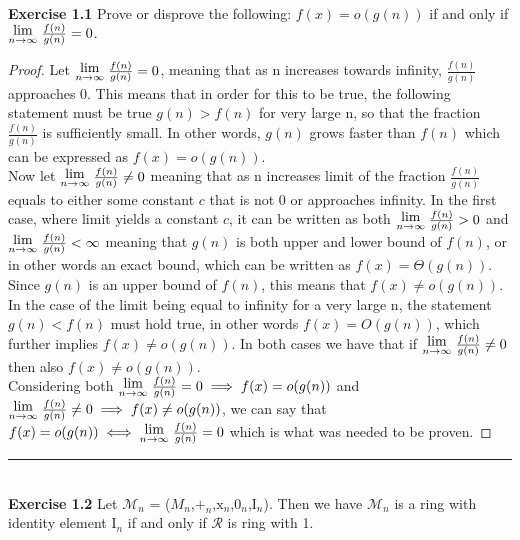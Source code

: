 \documentclass{article}
\newcommand{\Lim}[1]{\raisebox{0.5ex}{{$\displaystyle \lim_{#1}\;$}}}
\newcommand{\subtitle}[1]{%
  \posttitle{%
    \par\end{center}
    \begin{center}\LARGE#1\end{center}
    \vskip0.5em}%
}
\begin{document}
\subtitle{Lecture I}\\
\noindent \textbf{Exercise 1.1} Prove or disprove the following: $f(x) = o(g(n))$ if and only if $\Lim{n \to \infty} \frac{f(n)}{g(n)}=0$.
\begin{proof}
  Let $\Lim{n \to \infty} \frac{f(n)}{g(n)}=0$, meaning that as n increases towards infinity, $\frac{f(n)}{g(n)}$ approaches 0. This means that in order for this to be true, the following statement must be true $g(n) > f(n)$ for very large n, so that the fraction $\frac{f(n)}{g(n)}$ is sufficiently small. In other words, $g(n)$ grows faster than $f(n)$ which can be expressed as $f(x) = o(g(n))$. \\
  
  Now let $\Lim{n \to \infty} \frac{f(n)}{g(n)}\neq0$ meaning that as n increases limit of the fraction $\frac{f(n)}{g(n)}$ equals to either some constant $c$ that is not 0 or approaches infinity. In the first case, where limit yields a constant $c$, it can be written as both $\Lim{n \to \infty} \frac{f(n)}{g(n)}>0$ and $\Lim{n \to \infty} \frac{f(n)}{g(n)}<\infty$ meaning that $g(n)$ is both upper and lower bound of $f(n)$, or in other words an exact bound, which can be written as $f(x) = \Theta(g(n))$. Since $g(n)$ is an upper bound of $f(n)$, this means that $f(x) \neq o(g(n))$. In the case of the limit being equal to infinity for a very large n, the statement $g(n) < f(n)$ must hold true, in other words $f(x) = O(g(n))$, which further implies $f(x) \neq o(g(n))$. In both cases we have that if $\Lim{n \to \infty} \frac{f(n)}{g(n)}\neq0$ then also $f(x) \neq o(g(n))$. \\
  
  Considering both $\Lim{n \to \infty} \frac{f(n)}{g(n)}=0 \implies f(x) = o(g(n))$ and $\Lim{n \to \infty} \frac{f(n)}{g(n)}\neq0 \implies f(x) \neq o(g(n))$, we can say that $f(x) = o(g(n)) \iff \Lim{n \to \infty} \frac{f(n)}{g(n)}=0$ which is what was needed to be proven.

\end{proof}
\noindent\rule{12cm}{0.4pt}\\
\noindent \textbf{Exercise 1.2} Let $\mathcal{M}_n$ = ($M_n$,$+_n$,$\mathrm{x}_n$,$0_n$,$\mathrm{I}_n$). Then we have $\mathcal{M}_n$ is a ring with identity element $\mathrm{I}_n$ if and only if $\mathcal{R}$ is ring with 1.
\end{document}
